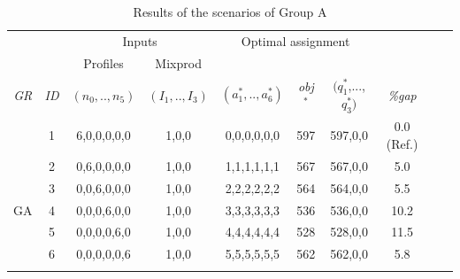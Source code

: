 \documentclass[review,12pt, 3p, times]{elsarticle}
\begin{document}
\setlength{\tabcolsep}{3pt}
\setcounter{table}{2}
\begin{longtable}{|c|c|c|c|c|c|c|c|c|r|}
    \hline
    & & \multicolumn{2}{c|}{Inputs} & \multicolumn{3}{c|}{Optimal assignment} &   \\
    & \multicolumn{1}{c|}{ } & \multicolumn{1}{c|}{Profiles} & \multicolumn{1}{c|}{Mixprod}& \multicolumn{1}{c}{}  & \multicolumn{2}{c|}{} &\multicolumn{1}{c|}{}\\
    \it{GR} & \it{ID} & \multicolumn{1}{c|}{$(n_0,..,n_5)$} & \multicolumn{1}{c|}{$(I_1,..,I_3)$} & {$(a^*_1,..,a^*_6)$} & \it{obj}$^*$ & $(q^*_1$,...,$q^*_3)$  & \it{\%gap} \\
    \hline
	        & 1       & 6,0,0,0,0,0                         & 1,0,0                               & 0,0,0,0,0,0          & 597          & 597,0,0                                    & 0.0 (Ref.)        \\
	        & 2       & 0,6,0,0,0,0                         & 1,0,0                               & 1,1,1,1,1,1          & 567          & 567,0,0                                    & 5.0        \\
	        & 3       & 0,0,6,0,0,0                         & 1,0,0                               & 2,2,2,2,2,2          & 564          & 564,0,0                                    & 5.5        \\
	{GA}%
	        & 4       & 0,0,0,6,0,0                         & 1,0,0                               & 3,3,3,3,3,3          & 536          & 536,0,0                                    & 10.2        \\
	        & 5       & 0,0,0,0,6,0                         & 1,0,0                               & 4,4,4,4,4,4          & 528          & 528,0,0                                    & 11.5        \\
	        & 6       & 0,0,0,0,0,6                         & 1,0,0                               & 5,5,5,5,5,5          & 562          & 562,0,0                                    & 5.8        \\
	\hline
	\caption{Results of the scenarios of Group A}
	\label{tab:tr_ga}
\end{longtable}
\end{document}
